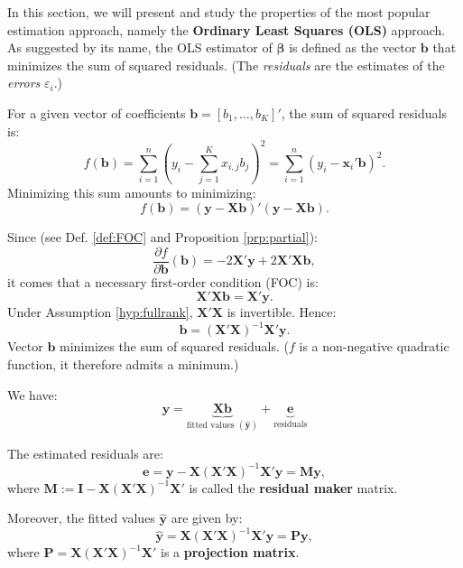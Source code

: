 \documentclass[
  12pt,
]{book}
\theoremstyle{definition}
\theoremstyle{definition}
\theoremstyle{definition}
\theoremstyle{definition}
\theoremstyle{remark}
\begin{document}
In this section, we will present and study the properties of the most popular estimation approach, namely the \textbf{Ordinary Least Squares (OLS)} approach. As suggested by its name, the OLS estimator of \(\boldsymbol\beta\) is defined as the vector \(\mathbf{b}\) that minimizes the sum of squared residuals. (The \emph{residuals} are the estimates of the \emph{errors} \(\varepsilon_i\).)

For a given vector of coefficients \(\mathbf{b}=[b_1,\dots,b_K]'\), the sum of squared residuals is:
\[
f(\mathbf{b}) =\sum_{i=1}^n \left(y_i - \sum_{j=1}^K x_{i,j} b_j \right)^2 = \sum_{i=1}^n (y_i - \mathbf{x}_i' \mathbf{b})^2.
\]
Minimizing this sum amounts to minimizing:
\[
f(\mathbf{b}) = (\mathbf{y} - \mathbf{X}\mathbf{b})'(\mathbf{y} - \mathbf{X}\mathbf{b}).
\]

Since (see Def. \ref{def:FOC} and Proposition \ref{prp:partial}):
\[
\frac{\partial f}{\partial \mathbf{b}}(\mathbf{b}) = - 2 \mathbf{X}'\mathbf{y} + 2 \mathbf{X}'\mathbf{X}\mathbf{b},
\]
it comes that a necessary first-order condition (FOC) is:
\begin{equation}
\mathbf{X}'\mathbf{X}\mathbf{b} = \mathbf{X}'\mathbf{y}.\label{eq:OLSFOC}
\end{equation}
Under Assumption \ref{hyp:fullrank}, \(\mathbf{X}'\mathbf{X}\) is invertible. Hence:
\[
\boxed{\mathbf{b} = (\mathbf{X}'\mathbf{X})^{-1} \mathbf{X}'\mathbf{y}.}
\]
Vector \(\mathbf{b}\) minimizes the sum of squared residuals. (\(f\) is a non-negative quadratic function, it therefore admits a minimum.)

We have:
\[
\mathbf{y} = \underbrace{\mathbf{X}\mathbf{b}}_{\mbox{fitted values } (\hat{\mathbf{y}})} + \underbrace{\mathbf{e}}_{\mbox{residuals}}
\]

The estimated residuals are:
\begin{equation}
\mathbf{e} = \mathbf{y} - \mathbf{X} (\mathbf{X}'\mathbf{X})^{-1} \mathbf{X}' \mathbf{y} = \mathbf{M} \mathbf{y},\label{eq:Mres}
\end{equation}
where \(\mathbf{M} := \mathbf{I} - \mathbf{X} (\mathbf{X}'\mathbf{X})^{-1} \mathbf{X}'\) is called the \textbf{residual maker} matrix.

Moreover, the fitted values \(\hat{\mathbf{y}}\) are given by:
\begin{equation}
\hat{\mathbf{y}}=\mathbf{X} (\mathbf{X}'\mathbf{X})^{-1} \mathbf{X}' \mathbf{y} = \mathbf{P} \mathbf{y},\label{eq:Proj}
\end{equation}
where \(\mathbf{P}=\mathbf{X} (\mathbf{X}'\mathbf{X})^{-1} \mathbf{X}'\) is a \textbf{projection matrix}.
\end{document}
